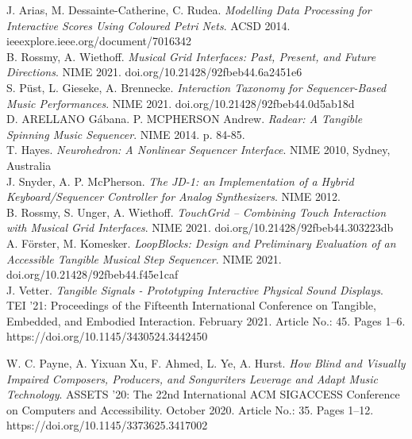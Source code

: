 \documentclass[journal,onecolumn]{IEEEtran}
\begin{document}
\begin{thebibliography}{1}
J. Arias, M. Dessainte-Catherine, C. Rudea. \emph{Modelling Data Processing for Interactive Scores Using Coloured Petri Nets}. ACSD 2014. ieeexplore.ieee.org/document/7016342 \\

B. Rossmy, A. Wiethoff. \emph{Musical Grid Interfaces: Past, Present, and Future Directions}. NIME 2021. doi.org/10.21428/92fbeb44.6a2451e6 \\

S. Püst, L. Gieseke, A. Brennecke. \emph{Interaction Taxonomy for Sequencer-Based Music Performances}. NIME 2021. doi.org/10.21428/92fbeb44.0d5ab18d \\

D. ARELLANO Gábana. P. MCPHERSON Andrew. \emph{Radear: A Tangible Spinning Music Sequencer}. NIME 2014. p. 84-85. \\

T. Hayes. \emph{Neurohedron: A Nonlinear Sequencer Interface}. NIME 2010, Sydney, Australia \\

J. Snyder, A. P. McPherson. \emph{The JD-1: an Implementation of a Hybrid Keyboard/Sequencer Controller for Analog Synthesizers}. NIME 2012. \\

B. Rossmy, S. Unger, A. Wiethoff. \emph{TouchGrid – Combining Touch Interaction with Musical Grid Interfaces}. NIME 2021. doi.org/10.21428/92fbeb44.303223db \\

A. Förster, M. Komesker. \emph{LoopBlocks: Design and Preliminary Evaluation of an Accessible Tangible Musical Step Sequencer}. NIME 2021. doi.org/10.21428/92fbeb44.f45e1caf \\

J. Vetter. \emph{Tangible Signals - Prototyping Interactive Physical Sound Displays}. TEI '21: Proceedings of the Fifteenth International Conference on Tangible, Embedded, and Embodied Interaction. February 2021. Article No.: 45. Pages 1–6. https://doi.org/10.1145/3430524.3442450

W. C. Payne, A. Yixuan Xu, F. Ahmed, L. Ye, A. Hurst. \emph{How Blind and Visually Impaired Composers, Producers, and Songwriters Leverage and Adapt Music Technology}. ASSETS '20: The 22nd International ACM SIGACCESS Conference on Computers and Accessibility. October 2020. Article No.: 35. Pages 1–12. https://doi.org/10.1145/3373625.3417002


\end{thebibliography}
\end{document}
